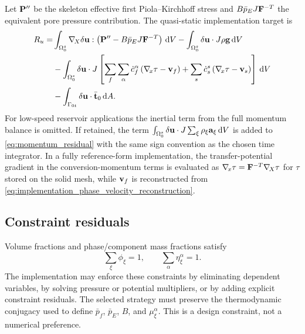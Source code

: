 Let \(\mathbf{P}^{\prime\prime}\) be the skeleton effective first
Piola--Kirchhoff stress and \(B\bar p_E J\mathbf{F}^{-T}\) the equivalent pore
pressure contribution.  The quasi-static implementation target is
\begin{align}
	R_u
	=&
	\int_{\Omega_0^s}
	\nabla_{\!X} \delta \mathbf{u} :
	\left(
		\mathbf{P}^{\prime\prime}
		-
		B\bar p_E J\mathbf{F}^{-T}
	\right)\,\mathrm{d} V
	-
	\int_{\Omega_0^s}
	\delta \mathbf{u}\cdot J\rho\mathbf{g}\,\mathrm{d} V
	\nonumber \\
	&-
	\int_{\Omega_0^s}
	\delta \mathbf{u}\cdot J
	\left[
			\sum_f\sum_\alpha
			\dot c_f^\alpha
			\left(
				\nabla_{\!x}\tau-\mathbf{v}_f
			\right)
			+
			\sum_s
			\dot c_s^s
			\left(
				\nabla_{\!x}\tau-\mathbf{v}_s
			\right)
	\right]\,\mathrm{d} V
	\nonumber \\
	&-
	\int_{\Gamma_{0t}}
	\delta \mathbf{u}\cdot \bar{\mathbf{t}}_0\,\mathrm{d} A .
	\label{eq:momentum_residual}
\end{align}
For low-speed reservoir applications the inertial term from the full momentum
balance is omitted.  If retained, the term
\(\int_{\Omega_0^s}\delta \mathbf{u}\cdot J\sum_\xi\rho_\xi\mathbf{a}_\xi\,\mathrm{d} V\)
is added to \eqref{eq:momentum_residual} with the same sign convention as the
chosen time integrator.  In a fully reference-form implementation, the
transfer-potential gradient in the conversion-momentum terms is evaluated as
\(\nabla_{\!x}\tau=\mathbf{F}^{-T}\nabla_{\!X}\tau\) for \(\tau\) stored on the solid mesh, while
\(\mathbf{v}_f\) is reconstructed from
\eqref{eq:implementation_phase_velocity_reconstruction}.

\subsection{Constraint residuals}
\label{sec:constraint_residuals}

Volume fractions and phase/component mass fractions satisfy
\[
	\sum_\xi \phi_\xi = 1, \qquad
	\sum_\alpha \eta_\xi^\alpha = 1 .
\]
The implementation may enforce these constraints by eliminating dependent
variables, by solving pressure or potential multipliers, or by adding explicit
constraint residuals.  The selected strategy must preserve the thermodynamic
conjugacy used to define \(\bar p_f\), \(\bar p_E\), \(B\), and
\(\mu_\xi^\alpha\).  This is a design constraint, not a numerical preference.
